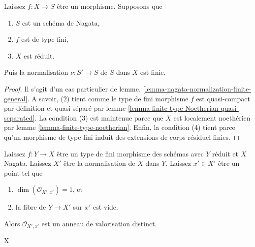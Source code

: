 \begin{lemma}

\label{lemma-nagata-normalization-finite}
Laissez $f : X \to S$ être un morphisme. Supposons que
\begin{enumerate}
\item $S$ est un schéma de Nagata,
\item $f$ est de type fini,
\item $X$ est réduit.
\end{enumerate}
Puis la normalisation $\nu : S' \to S$ de $S$ dans $X$ est finie.
\end{lemma}

\begin{proof}

Il s'agit d'un cas particulier de lemme. \ref{lemma-nagata-normalization-finite-general}. A savoir, (2) tient comme le type de fini morphisme $f$ est quasi-compact par définition et quasi-séparé par lemme \ref{lemma-finite-type-Noetherian-quasi-separated}. La condition (3) est maintenue parce que $X$ est localement noethérien par lemme \ref{lemma-finite-type-noetherian}. Enfin, la condition (4) tient parce qu'un morphisme de type fini induit des extensions de corps résiduel finies.

\end{proof}

\begin{lemma}

\label{lemma-relative-normalization-normal-codim-1}
Laissez $f : Y \to X$ être un type de fini morphisme des schémas avec $Y$ réduit et $X$ Nagata. Laissez $X'$ être la normalisation de $X$ dans $Y$. Laissez $x' \in X'$ être un point tel que
\begin{enumerate}
\item $\dim(\mathcal{O}_{X', x'}) = 1$, et
\item la fibre de $Y \to X'$ sur $x'$ est vide.
\end{enumerate}
Alors $\mathcal{O}_{X', x'}$ est un anneau de valorisation distinct.
\end{lemma}
X

